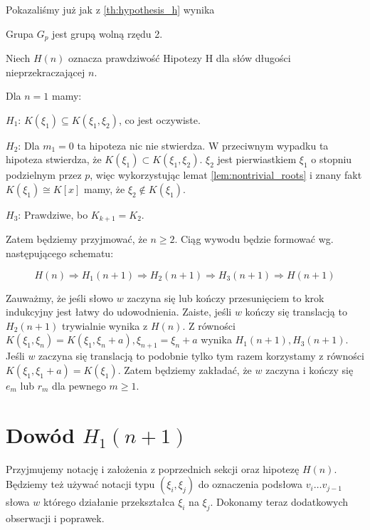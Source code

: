 Pokazaliśmy już jak z \ref{th:hypothesis_h} wynika

\begin{corollary}
  Grupa $G_p$ jest grupą wolną rzędu 2.
\end{corollary}

Niech $H(n)$ oznacza prawdziwość Hipotezy H dla słów długości nieprzekraczającej
$n$.

Dla $n=1$ mamy:
\begin{description}
  \item{$H_1$:} 
    $K\left(\xi_1\right) \subseteq K\left(\xi_1, \xi_2\right)$, co jest
    oczywiste.
  \item{$H_2$:} Dla $m_1 = 0$ ta hipoteza nic nie stwierdza. W przeciwnym
    wypadku ta hipoteza stwierdza, że $K\left(\xi_1\right) \subset K\left(\xi_1,
    \xi_2\right)$. $\xi_2$ jest pierwiastkiem $\xi_1$ o stopniu podzielnym przez
    $p$, więc wykorzystując lemat \ref{lem:nontrivial_roots} i znany fakt
    $K\left(\xi_1\right) \cong K[x]$ mamy, że $\xi_2 \not \in
    K\left(\xi_1\right)$.
  \item{$H_3$:} Prawdziwe, bo $K_{k+1} = K_2$.

\end{description}

Zatem będziemy przyjmować, że $n \geq 2$. Ciąg wywodu będzie formować wg.
następującego schematu:

\[ H(n) \Rightarrow H_1(n+1) \Rightarrow H_2(n+1) \Rightarrow H_3(n+1)
\Rightarrow H(n+1)\]

Zauważmy, że jeśli słowo $w$ zaczyna się lub kończy przesunięciem to krok
indukcyjny jest łatwy do udowodnienia. Zaiste, jeśli $w$ kończy się translacją
to $H_2(n+1)$ trywialnie wynika z $H(n)$.  Z równości $K\left(\xi_1,
\xi_{n}\right) = K\left(\xi_1, \xi_{n} + a\right), \xi_{n+1} = \xi_n + a$ wynika
$H_1(n+1), H_3(n+1)$. Jeśli $w$ zaczyna się translacją to podobnie tylko tym
razem korzystamy z równości $K\left(\xi_1, \xi_1 + a\right) =
K\left(\xi_1\right)$. Zatem będziemy zakładać, że $w$ zaczyna i kończy się $e_m$
lub $r_m$ dla pewnego $m \geq 1$.

\section{Dowód $H_1(n+1)$}
Przyjmujemy notację i założenia z poprzednich sekcji oraz hipotezę $H(n)$.
Będziemy też używać notacji typu $\left(\xi_i, \xi_j\right)$ do oznaczenia
podsłowa $v_i\ldots v_{j-1}$ słowa $w$ którego działanie przekształca $\xi_i$ na
$\xi_j$. Dokonamy teraz dodatkowych obserwacji i poprawek.

